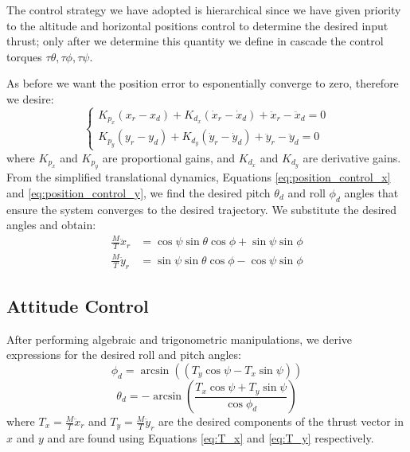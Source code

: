 The control strategy we have adopted is hierarchical \cite{model_quadrotor}
since we have given priority to the 
altitude and horizontal positions control to determine the desired input thrust;
only after we determine this quantity
we define in cascade the control torques $\tau\theta, \tau\phi, \tau\psi$.

As before we want the position error to esponentially converge to zero,
therefore we desire:
\begin{equation}
    \begin{cases}
        K_{p_x} ( x_r - x_d )  + K_{d_x} (\dot{x}_r -\dot{x}_d) + \ddot{x}_r -\ddot{x}_d  = 0 \\[6pt]
        K_{p_y} (y_r - y_d )  + K_{d_y} ( \dot{y}_r - \dot{y}_d) +  \ddot{y}_r - \ddot{y}_d = 0
    \end{cases}
\end{equation}
where $K_{p_x}$ and $K_{p_y}$ are proportional gains, and $K_{d_x}$ and $K_{d_y}$ are derivative gains.
\noindent \\
From the simplified translational dynamics, Equations \ref{eq:position_control_x}
and \ref{eq:position_control_y}, we find the desired pitch \( \theta_d \) 
and roll \( \phi_d \) angles that ensure the system converges to the desired trajectory.
We substitute the desired angles and obtain:
\begin{subequations}
    \begin{align}
    \frac{M}{T} \ddot{x}_r &= \cos\psi \sin\theta \cos\phi + \sin\psi \sin\phi \label{eq:T_x} \\[6pt]
    \frac{M}{T} \ddot{y}_r &= \sin\psi \sin\theta \cos\phi - \cos\psi \sin\phi \label{eq:T_y}
    \end{align}
\end{subequations}
\subsection{Attitude Control}
\noindent
After performing algebraic and trigonometric manipulations, we derive expressions for the desired roll and pitch angles:
\begin{equation}
    \phi_d =  \arcsin\left(  (T_y \cos\psi - T_x \sin\psi) \right)
    \label{eq:desire_phi}
\end{equation}
\begin{equation}
    \theta_d = - \arcsin\left(\frac{T_x \cos\psi + T_y \sin\psi}{ \cos\phi_d } \right)
    \label{eq:desire_theta}
\end{equation}
where $T_x = \frac{M}{T} \ddot{x}_r$ and $T_y = \frac{M}{T} \ddot{y}_r$ are the
desired components of the thrust vector in $x$ and $y$ and are found
using Equations \ref{eq:T_x} and \ref{eq:T_y} respectively.

